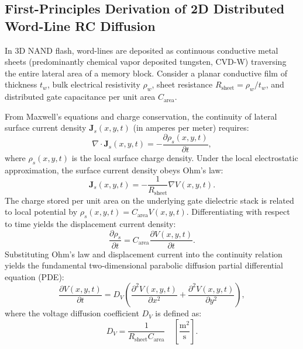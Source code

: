\documentclass[journal]{IEEEtran}
\begin{document}
\subsection{First-Principles Derivation of 2D Distributed Word-Line RC Diffusion}
In 3D NAND flash, word-lines are deposited as continuous conductive metal sheets (predominantly chemical vapor deposited tungsten, CVD-W) traversing the entire lateral area of a memory block. Consider a planar conductive film of thickness $t_w$, bulk electrical resistivity $\rho_w$, sheet resistance $R_{\text{sheet}} = \rho_w / t_w$, and distributed gate capacitance per unit area $C_{\text{area}}$. 

From Maxwell's equations and charge conservation, the continuity of lateral surface current density $\mathbf{J}_s(x, y, t)$ (in amperes per meter) requires:
\begin{equation}
    \nabla \cdot \mathbf{J}_s(x, y, t) = -\frac{\partial \rho_s(x, y, t)}{\partial t},
\end{equation}
where $\rho_s(x, y, t)$ is the local surface charge density. Under the local electrostatic approximation, the surface current density obeys Ohm's law:
\begin{equation}
    \mathbf{J}_s(x, y, t) = -\frac{1}{R_{\text{sheet}}} \nabla V(x, y, t).
\end{equation}
The charge stored per unit area on the underlying gate dielectric stack is related to local potential by $\rho_s(x, y, t) = C_{\text{area}} V(x, y, t)$. Differentiating with respect to time yields the displacement current density:
\begin{equation}
    \frac{\partial \rho_s}{\partial t} = C_{\text{area}} \frac{\partial V(x, y, t)}{\partial t}.
\end{equation}
Substituting Ohm's law and displacement current into the continuity relation yields the fundamental two-dimensional parabolic diffusion partial differential equation (PDE):
\begin{equation}
    \frac{\partial V(x, y, t)}{\partial t} = D_V \left( \frac{\partial^2 V(x, y, t)}{\partial x^2} + \frac{\partial^2 V(x, y, t)}{\partial y^2} \right),
    \label{eq:2d_diffusion_pde}
\end{equation}
where the voltage diffusion coefficient $D_V$ is defined as:
\begin{equation}
    D_V = \frac{1}{R_{\text{sheet}} C_{\text{area}}} \quad \left[ \frac{\text{m}^2}{\text{s}} \right].
\end{equation}
\end{document}
